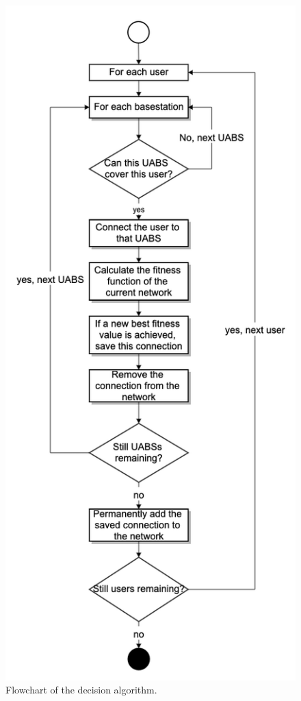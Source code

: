 \documentclass[twocolumn]{phdsymp} %
\begin{document}
\begin{figure}[h!]
\centering
  \includegraphics[height=0.8\textheight]{decisionAlgoFlowChart.png}
  \caption{Flowchart of the decision algorithm.}
  \label{fig:decisionAlgoFlowChart}
\end{figure}
\end{document}
